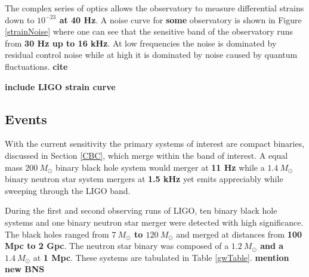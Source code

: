 \documentclass [12pt, proquest]{uwthesis}[2019]
\begin{document}
The complex series of optics allows the observatory to measure differential strains down to \textbf{$10^{-23}$ at 40 Hz}.  A noise curve for \textbf{some} observatory is shown in Figure \ref{strainNoise} where one can see that the sensitive band of the observatory runs from \textbf{30 Hz up to 16 kHz}. At low frequencies the noise is dominated by residual control noise while at high it is dominated by noise caused by quantum fluctuations.  \textbf{cite}

\textbf{include LIGO strain curve}

\subsection{Events}

With the current sensitivity the primary systems of interest are compact binaries, discussed in Section \ref{CBC}, which merge within the band of interest. A equal mass \textbf{$200\ M_\odot$} binary black hole system would merger at \textbf{11 Hz} while a \textbf{$1.4\ M_\odot$} binary neutron star system mergers at \textbf{1.5 kHz} yet emits appreciably while sweeping through the LIGO band.

During the first and second observing runs of LIGO, ten binary black hole systems and one binary neutron star merger were detected with high significance. \cite{GWTC} The black holes ranged from \textbf{$7\ M_\odot$ to $120\ M_\odot$} and merged at distances from \textbf{100 Mpc to 2 Gpc}. The neutron star binary was composed of a \textbf{$1.2\ M_\odot$ and a $1.4\ M_\odot$} at \textbf{1 Mpc}. These systems are tabulated in Table \ref{gwTable}. \textbf{mention new BNS}
\end{document}
